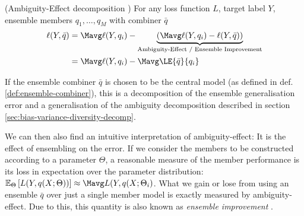 \documentclass[../main.tex]{subfiles}
\begin{document}
\begin{theorem} \label{thm:ambig-effect-decomp} (Ambiguity-Effect decomposition \cite{todo}) For any loss function $L$, target label $Y$, ensemble members $q_{1}, \dots, q_{M}$ with combiner $\bar{q}$
\begin{align*}
\ell(Y, \bar{q}) &= \Mavg \ell(Y, q_{i}) -
\underbrace{\left(\Mavg \ell(Y, q_{i}) - \ell(Y, \bar{q})\right)}_{\text{Ambiguity-Effect / Ensemble Improvement}} \\
&= \Mavg \ell(Y, q_i) - \Mavg \LE{\bar{q}}{q_i}
\end{align*}
\end{theorem}
If the ensemble combiner $\bar{q}$ is chosen to be the central model (as defined in def. \ref{def:ensemble-combiner}), this is a decomposition of the ensemble generalisation error and a generalisation of the ambiguity decomposition described in section \ref{sec:bias-variance-diversity-decomp}.

We can then also find an intuitive interpretation of ambiguity-effect: It is the effect of ensembling on the error. If we consider the members to be constructed according to a parameter $\Theta$, a reasonable measure of the member performance is its loss in expectation over the parameter distribution: $\mathbb{E}_{\Theta}\left[ L(Y, q(X; \Theta))  \right] \approx \Mavg L(Y, q(X;\Theta_{i})$. What we gain or lose from using an ensemble $\bar{q}$ over just a single member model is exactly measured by ambiguity-effect. Due to this, this quantity is also known as \textit{ensemble improvement} \cite{theisen, and others?}.



\end{document}

